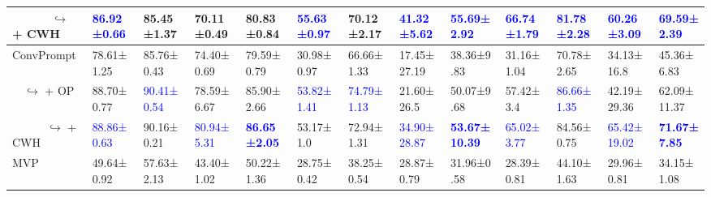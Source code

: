 \begin{table*}[t]
{\begin{tabular}{l|llla|llla|llla}
\ \ \ \ \ \ $\hookrightarrow$ + CWH          & \textcolor{blue}{86.92{\scriptsize±0.66}}    & 85.45{\scriptsize±1.37}                           & 70.11{\scriptsize±0.49}                    & 80.83{\scriptsize±0.84}  & \textcolor{blue}{55.63{\scriptsize±0.97}} & 70.12{\scriptsize±2.17}                   & \textcolor{blue}{41.32{\scriptsize±5.62}}     & \textbf{\textcolor{blue}{55.69{\scriptsize±2.92}}}   & \textcolor{blue}{66.74{\scriptsize±1.79}} & \textcolor{blue}{81.78{\scriptsize±2.28}} & \textcolor{blue}{60.26{\scriptsize±3.09}}     & \textbf{\textcolor{blue}{69.59{\scriptsize±2.39}}} \\  
\hline
ConvPrompt                                   & 78.61{\scriptsize±1.25}                      & 85.76{\scriptsize±0.43}                           & 74.40{\scriptsize±0.69}                    & 79.59{\scriptsize±0.79}  & 30.98{\scriptsize±0.97}                   & 66.66{\scriptsize±1.33}                   & 17.45{\scriptsize±27.19}                      & 38.36{\scriptsize±9.83}   & 31.16{\scriptsize±1.04}                   & 70.78{\scriptsize±2.65}                   & 34.13{\scriptsize±16.8}                       & 45.36{\scriptsize±6.83} \\  
\ \  $\hookrightarrow$ + OP                  & 88.70{\scriptsize±0.77}                      & \textcolor{blue}{90.41{\scriptsize±0.54}}         & 78.59{\scriptsize±6.67}                    & 85.90{\scriptsize±2.66}  & \textcolor{blue}{53.82{\scriptsize±1.41}} & \textcolor{blue}{74.79{\scriptsize±1.13}}                   & 21.60{\scriptsize±26.5}                       & 50.07{\scriptsize±9.68}   & 57.42{\scriptsize±3.4}                    & \textcolor{blue}{86.66{\scriptsize±1.35}} & 42.19{\scriptsize±29.36}                      & 62.09{\scriptsize±11.37} \\    
\ \ \ \ \ \ $\hookrightarrow$ + CWH          & \textcolor{blue}{88.86{\scriptsize±0.63}}    & 90.16{\scriptsize±0.21}                           & \textcolor{blue}{80.94{\scriptsize±5.31}}  & \textbf{\textcolor{blue}{86.65{\scriptsize±2.05}}}  & 53.17{\scriptsize±1.0}                    & 72.94{\scriptsize±1.31} & \textcolor{blue}{34.90{\scriptsize±28.87}}    & \textbf{\textcolor{blue}{53.67{\scriptsize±10.39}}}  & \textcolor{blue}{65.02{\scriptsize±3.77}} & 84.56{\scriptsize±0.75}                   & \textcolor{blue}{65.42{\scriptsize±19.02}}    & \textbf{\textcolor{blue}{71.67{\scriptsize±7.85}}} \\  
\hline
MVP                                          & 49.64{\scriptsize±0.92}                      & 57.63{\scriptsize±2.13}                           & 43.40{\scriptsize±1.02}                    & 50.22{\scriptsize±1.36}  & 28.75{\scriptsize±0.42}                   & 38.25{\scriptsize±0.54}                   & 28.87{\scriptsize±0.79}                       & 31.96{\scriptsize±0.58}   & 28.39{\scriptsize±0.81}                   & 44.10{\scriptsize±1.63}                   & 29.96{\scriptsize±0.81}                       & 34.15{\scriptsize±1.08} \\  

\end{tabular}}
\end{table*}

